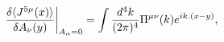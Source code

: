 \begin{equation}
\left.{{\delta \langle J^{5\mu}(x) \rangle}\over {\delta
A_\nu(y)}}\right|_{A_{\alpha}=0} = \int {{d^4k} \over {(2\pi)^4}}
\Pi^{\mu\nu}(k) e^{ik.(x-y)}, \label{e3}
\end{equation}

